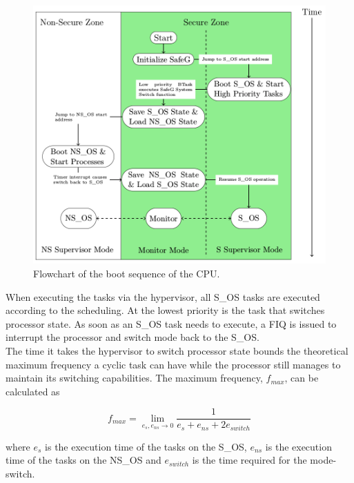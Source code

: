 \begin{figure}[H]
\centering
\includegraphics[width=\textwidth]{./img/literature_modeswitch.png}
\caption{Flowchart of the boot sequence of the CPU. \cite{zaki2016}}\label{fig:modeswitch}
\end{figure}

When executing the tasks via the hypervisor, all S\_OS tasks are executed according to the scheduling. At the lowest priority is the task that switches processor state. As soon as an S\_OS task needs to execute, a FIQ is issued to interrupt the processor and switch mode back to the S\_OS. \\

The time it takes the hypervisor to switch processor state bounds the theoretical maximum frequency a cyclic task can have while the processor still manages to maintain its switching capabilities. The maximum frequency, $f_{max}$, can be calculated as

\begin{equation} \label{eq:max_frequency}
f_{max} = \lim_{e_s, e_{ns} \to 0} \frac{1}{e_s+e_{ns}+2e_{switch}}
\end{equation}

where $e_s$ is the execution time of the tasks on the S\_OS, $e_{ns}$ is the execution time of the tasks on the NS\_OS and $e_{switch}$ is the time required for the mode-switch.\\

